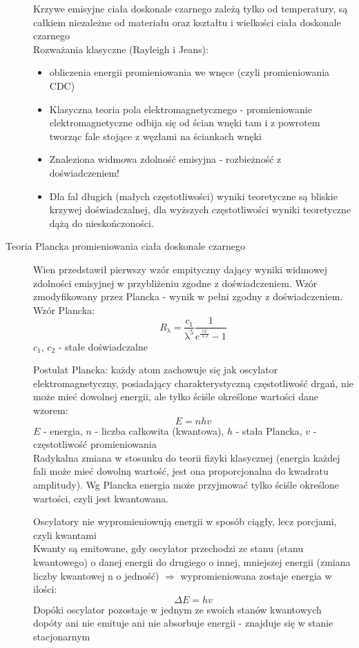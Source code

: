 \documentclass[a4paper,11pt]{article}
\begin{document}
\begin{description}
  Krzywe emisyjne ciała doskonale czarnego zależą tylko od temperatury, są całkiem niezależne od materiału oraz kształtu i wielkości ciała doskonale czarnego\\
  Rozważania klasyczne (Rayleigh i Jeans):
  \begin{itemize}
  \item obliczenia energii promieniowania we wnęce (czyli promieniowania CDC)
  \item Klasyczna teoria pola elektromagnetycznego - promieniowanie elektromagnetyczne odbija się od ścian wnęki tam i z powrotem tworząc fale stojące z węzłami na ściankach wnęki
  \item Znaleziona widmowa zdolność emisyjna - rozbieżność z doświadczeniem!
  \item Dla fal długich (małych częstotliwości) wyniki teoretyczne są bliskie krzywej doświadczalnej, dla wyższych częstotliwości wyniki teoretyczne dążą do nieskończoności.
  \end{itemize}
\item[Teoria Plancka promieniowania ciała doskonale czarnego] Wien przedstawił pierwszy wzór empityczny dający wyniki widmowej zdolności emisyjnej w przybliżeniu zgodne z doświadczeniem. Wzór zmodyfikowany przez Plancka - wynik w pełni zgodny z doświadczeniem. Wzór Plancka:
  $$R_\uplambda=\frac{c_1}{\uplambda^5}\frac{1}{e^\frac{c2}{\uplambda T} - 1}$$
  $c_1$, $c_2$ - stałe doświadczalne

  Postulat Plancka: każdy atom zachowuje się jak oscylator elektromagnetyczny, posiadający charakterystyczną częstotliwość drgań, nie może mieć dowolnej energii, ale tylko ściśle określone wartości dane wzorem:
  $$E=nhv$$
  $E$ - energia, $n$ - liczba całkowita (kwantowa), $h$ - stała Plancka, $v$ - częstotliwość promieniowania\\
  Radykalna zmiana w stosunku do teorii fizyki klasycznej (energia każdej fali może mieć dowolną wartość, jest ona proporcjonalna do kwadratu amplitudy). Wg Plancka energia może przyjmować tylko ściśle określone wartości, czyli jest kwantowana.

  Oscylatory nie wypromieniowują energii w sposób ciągły, lecz porcjami, czyli kwantami\\
  Kwanty są emitowane, gdy oscylator przechodzi ze stanu (stanu kwantowego) o danej energii do drugiego o innej, mniejszej energii (zmiana liczby kwantowej n o jedność) $\Rightarrow$ wypromieniowana zostaje energia w ilości:
  $$\Delta E = hv$$
  Dopóki oscylator pozostaje w jednym ze swoich stanów kwantowych dopóty ani nie emituje ani nie absorbuje energii - znajduje się w stanie stacjonarnym


\end{description}
\end{document}
